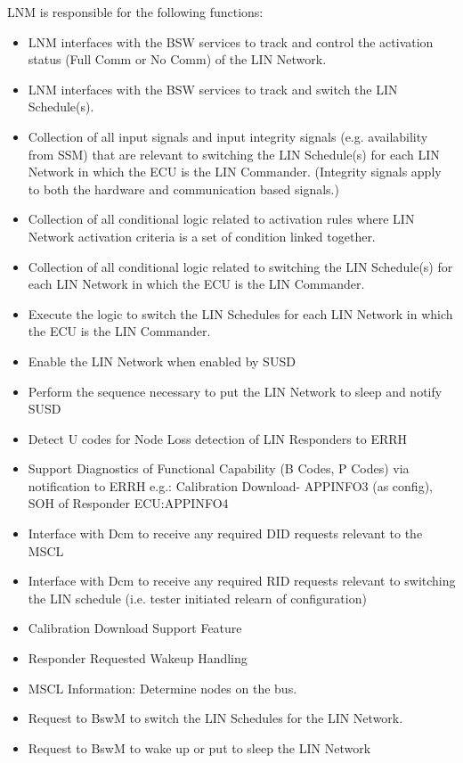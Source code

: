 LNM is responsible for the following functions:
\begin{itemize}
\item LNM interfaces with the BSW services to track and control the activation status (Full Comm or No Comm) of the LIN Network.
\item LNM interfaces with the BSW services to track and switch the LIN Schedule(s).
\item Collection of all input signals and input integrity signals (e.g. availability from SSM) that are relevant to switching the LIN Schedule(s) for each LIN Network in which the ECU is the LIN Commander. (Integrity signals apply to both the hardware and communication based signals.)
\item Collection of all conditional logic related to activation rules where LIN Network activation criteria is a set of condition linked together.
\item Collection of all conditional logic related to switching the LIN Schedule(s) for each LIN Network in which the ECU is the LIN Commander.
\item Execute the logic to switch the LIN Schedules for each LIN Network in which the ECU is the LIN Commander.
\item Enable the LIN Network when enabled by SUSD
\item Perform the sequence necessary to put the LIN Network to sleep and notify SUSD
\item Detect U codes for Node Loss detection of LIN Responders to ERRH
\item Support Diagnostics of Functional Capability (B Codes, P Codes) via notification to ERRH e.g.: Calibration Download- APPINFO3 (as config), SOH of Responder ECU:APPINFO4
\item Interface with Dcm to receive any required DID requests relevant to the MSCL
\item Interface with Dcm to receive any required RID requests relevant to switching the LIN schedule (i.e. tester initiated relearn of configuration)
\item Calibration Download Support Feature
\item Responder Requested Wakeup Handling
\item MSCL Information: Determine nodes on the bus.
\item Request to BswM to switch the LIN Schedules for the LIN Network.
\item Request to BswM to wake up or put to sleep the LIN Network
\end{itemize}

